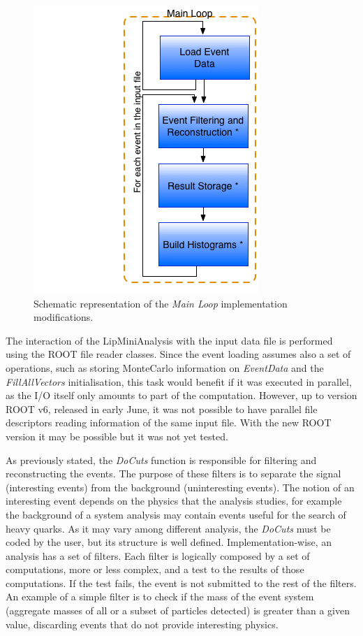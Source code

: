 \begin{figure}[!htp]
	\begin{center}
		\includegraphics[scale=0.5]{imgs/new_loop.png}
		\caption{Schematic representation of the \textit{Main Loop} implementation modifications.}
		\label{fig:new_loop}
	\end{center}
\end{figure}

The interaction of the LipMiniAnalysis with the input data file is performed using the ROOT file reader classes. Since the event loading assumes also a set of operations, such as storing MonteCarlo information on \textit{EventData} and the \textit{FillAllVectors} initialisation, this task would benefit if it was executed in parallel, as the I/O itself only amounts to part of the computation. However, up to version ROOT v6, released in early June, it was not possible to have parallel file descriptors reading information of the same input file. With the new ROOT version it may be possible but it was not yet tested.

As previously stated, the \textit{DoCuts} function is responsible for filtering and reconstructing the events. The purpose of these filters is to separate the signal (interesting events) from the background (uninteresting events). The notion of an interesting event depends on the physics that the analysis studies, for example the background of a \ttH system analysis may contain events useful for the search of heavy quarks. As it may vary among different analysis, the \textit{DoCuts} must be coded by the user, but its structure is well defined. Implementation-wise, an analysis has a set of filters. Each filter is logically composed by a set of computations, more or less complex, and a test to the results of those computations. If the test fails, the event is not submitted to the rest of the filters. An example of a simple filter is to check if the mass of the event system (aggregate masses of all or a subset of particles detected) is greater than a given value, discarding events that do not provide interesting physics.

